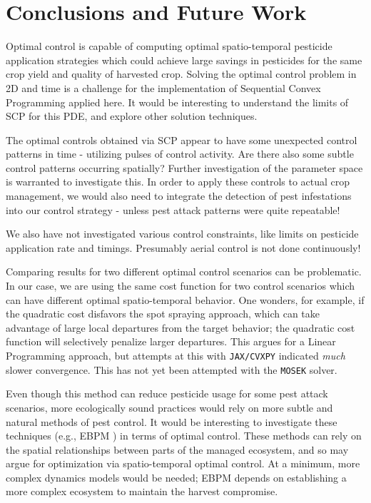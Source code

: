 \documentclass[11pt]{article}
\begin{document}
\section{Conclusions and Future Work}

Optimal control is capable of computing optimal spatio-temporal pesticide application strategies which could achieve large savings in pesticides for the same crop yield and quality of harvested crop. Solving the optimal control problem in 2D and time is a challenge for the implementation of Sequential Convex Programming applied here. It would be interesting to understand the limits of SCP for this PDE, and explore other solution techniques.

The optimal controls obtained via SCP appear to have some unexpected control patterns in time - utilizing pulses of control activity. Are there also some subtle control patterns occurring spatially? Further investigation of the parameter space is warranted to investigate this. In order to apply these controls to actual crop management, we would also need to integrate the detection of pest infestations into our control strategy - unless pest attack patterns were quite repeatable!

We also have not investigated various control constraints, like limits on pesticide application rate and timings. Presumably aerial control is not done continuously!

Comparing results for two different optimal control scenarios can be problematic. In our case, we are using the same cost function for two control scenarios which can have different optimal spatio-temporal behavior. One wonders, for example, if the quadratic cost disfavors the spot spraying approach, which can take advantage of large local departures from the target behavior; the quadratic cost function will selectively penalize larger departures. This argues for a Linear Programming approach, but attempts at this with \texttt{JAX/CVXPY} indicated \textit{much} slower convergence. This has not yet been attempted with the \texttt{MOSEK} solver.

Even though this method can reduce pesticide usage for some pest attack scenarios, more ecologically sound practices would rely on more subtle and natural methods of pest control. It would be interesting to investigate these techniques (e.g., EBPM \cite{R3}) in terms of optimal control. These methods can rely on the spatial relationships between parts of the managed ecosystem, and so may argue for optimization via spatio-temporal optimal control. At a minimum, more complex dynamics models would be needed; EBPM depends on establishing a more complex ecosystem to maintain the harvest compromise. 
\end{document}
